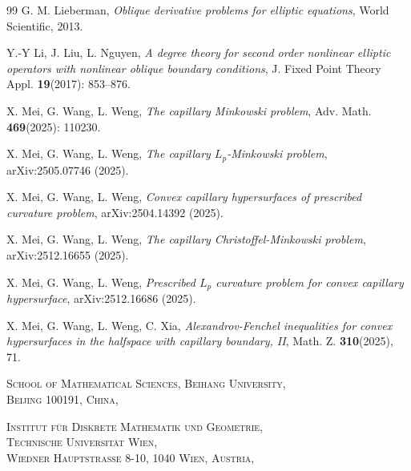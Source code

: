 \documentclass[12pt]{amsart}
\numberwithin{equation}{section}
\newcommand{\8}{\infty}
\begin{document}
\begin{thebibliography}{99}
G. M. Lieberman, \textit{Oblique derivative problems for elliptic equations}, World Scientific, 2013.

 Y.-Y Li, J. Liu, L. Nguyen, \textit{A degree theory for second order nonlinear elliptic operators with nonlinear oblique boundary conditions}, J. Fixed Point Theory Appl. \textbf{19}(2017): 853--876.

X. Mei, G. Wang, L. Weng, \textit{The capillary Minkowski problem}, Adv. Math. \textbf{469}(2025): 110230.

X. Mei, G. Wang, L. Weng, \textit{The capillary $L_p$-Minkowski problem}, arXiv:2505.07746 (2025).

 X. Mei, G. Wang, L. Weng, \textit{Convex capillary hypersurfaces of prescribed curvature problem}, arXiv:2504.14392 (2025).

X. Mei, G. Wang, L. Weng, \textit{The capillary Christoffel-Minkowski problem}, arXiv:2512.16655 (2025).

 X. Mei, G. Wang, L. Weng, \textit{Prescribed $ L_{p} $ curvature problem for convex capillary hypersurface}, arXiv:2512.16686 (2025).

X. Mei, G. Wang, L. Weng, C. Xia, \textit{Alexandrov-Fenchel inequalities for convex hypersurfaces in the halfspace with capillary boundary, II}, Math. Z. \textbf{310}(2025), 71.

\end{thebibliography}

\vspace{5mm}
\textsc{School of Mathematical Sciences, Beihang University,\\ Beijing 100191, China,\\}

\vspace{5mm}
\textsc{Institut f\"{u}r Diskrete Mathematik und Geometrie,\\ Technische Universit\"{a}t Wien,\\ Wiedner Hauptstra{\ss}e 8-10, 1040 Wien, Austria,\\}
\end{document}

